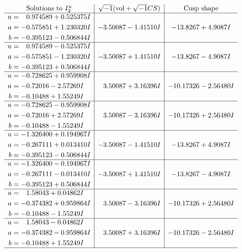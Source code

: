 \documentclass[1p]{elsarticle_modified}
\theoremstyle{definition}
\newcommand{\I}{\sqrt{-1}}
\begin{document}
$$\begin{array}{c|c|c}  
\text{Solutions to }I^u_{2}& \I (\text{vol} + \sqrt{-1}CS) & \text{Cusp shape}\\
 \hline 
\begin{aligned}
u &= \phantom{-}0.974589 + 0.525375 I \\
a &= -0.575851 + 1.230320 I \\
b &= -0.395123 - 0.506844 I\end{aligned}
 & -3.50087 - 1.41510 I & -13.8267 + 4.9087 I \\ \hline\begin{aligned}
u &= \phantom{-}0.974589 - 0.525375 I \\
a &= -0.575851 - 1.230320 I \\
b &= -0.395123 + 0.506844 I\end{aligned}
 & -3.50087 + 1.41510 I & -13.8267 - 4.9087 I \\ \hline\begin{aligned}
u &= -0.728625 + 0.959908 I \\
a &= -0.72016 - 2.57269 I \\
b &= -0.10488 + 1.55249 I\end{aligned}
 & \phantom{-}3.50087 + 3.16396 I & -10.17326 - 2.56480 I \\ \hline\begin{aligned}
u &= -0.728625 - 0.959908 I \\
a &= -0.72016 + 2.57269 I \\
b &= -0.10488 - 1.55249 I\end{aligned}
 & \phantom{-}3.50087 - 3.16396 I & -10.17326 + 2.56480 I \\ \hline\begin{aligned}
u &= -1.326400 + 0.194967 I \\
a &= -0.267111 + 0.013410 I \\
b &= -0.395123 - 0.506844 I\end{aligned}
 & -3.50087 - 1.41510 I & -13.8267 + 4.9087 I \\ \hline\begin{aligned}
u &= -1.326400 - 0.194967 I \\
a &= -0.267111 - 0.013410 I \\
b &= -0.395123 + 0.506844 I\end{aligned}
 & -3.50087 + 1.41510 I & -13.8267 - 4.9087 I \\ \hline\begin{aligned}
u &= \phantom{-}1.58043 + 0.04862 I \\
a &= -0.374382 + 0.959864 I \\
b &= -0.10488 - 1.55249 I\end{aligned}
 & \phantom{-}3.50087 - 3.16396 I & -10.17326 + 2.56480 I \\ \hline\begin{aligned}
u &= \phantom{-}1.58043 - 0.04862 I \\
a &= -0.374382 - 0.959864 I \\
b &= -0.10488 + 1.55249 I\end{aligned}
 & \phantom{-}3.50087 + 3.16396 I & -10.17326 - 2.56480 I\\
 \hline 
 \end{array}$$\newpage\newpage\renewcommand{\arraystretch}{1}
\end{document}
